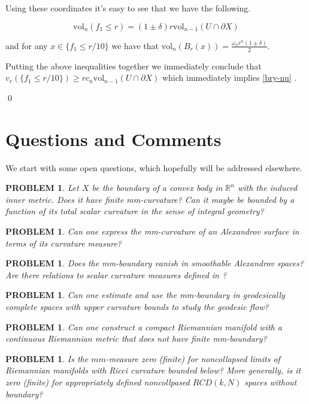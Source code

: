\documentclass[12pt,leqno,intlimits]{amsart}
\numberwithin{equation}{section}
\newtheorem{quest}[thm]{PROBLEM}
\theoremstyle{definition}
\theoremstyle{remark}
\newcommand{\vol}{\mathrm{vol}}
\newcommand{\R}{\mathbb{R}}
\def\qeds{\qed\par\medskip}
\def\qedsf{\vskip-6mm\qeds}
\begin{document}
Using these coordinates it's easy to see that we have the following.

\[
\vol_n(f_1\le r)=(1\pm\delta)r\vol_{n-1}(U\cap\partial X)
\]

and for any $x\in \{f_1\le r/10\}$ we have that $\vol_n(B_r(x))=\frac{\omega_nr^n(1\pm\delta)}{2}$.

Putting the above inequalities together we immediately conclude that $v_r( \{f_1\le r/10\})\ge rc_n\vol_{n-1}(U\cap\partial X)$ which immediately implies \eqref{bry-nu} .

\qedsf

\section{Questions and Comments} \label{sec:final}
We start with some open questions, which hopefully will be addressed elsewhere.










\begin{quest} Let $X$ be the boundary of a convex body in $\R ^n$ with the induced inner metric.
Does it have finite mm-curvature?  Can it maybe be bounded by a function of its total scalar curvature
in the sense of integral geometry?
\end{quest}


\begin{quest}
Can one express the mm-curvature of an Alexandrov  surface in terms of its curvature measure?
\end{quest}

\begin{quest}
Does the mm-boundary vanish  in smoothable Alexandrov spaces?   Are there relations to scalar curvature measures defined in \cite{LP}?
\end{quest}


\begin{quest}
Can one estimate and use the mm-boundary in geodesically complete spaces with upper curvature bounds to study the geodesic flow?
\end{quest}



\begin{quest}
 Can one construct a compact Riemannian manifold with a continuous Riemannian metric
that does not have finite mm-boundary?
\end{quest}
{\color{red}
\begin{quest}
Is the $mm$-measure zero (finite) for noncollapsed limits of Riemannian manifolds with Ricci curvature bounded below? More generally, is it zero (finite) for appropriately defined noncollpased $RCD(k,N)$ spaces without boundary?
\end{quest}
}



\end{document}
